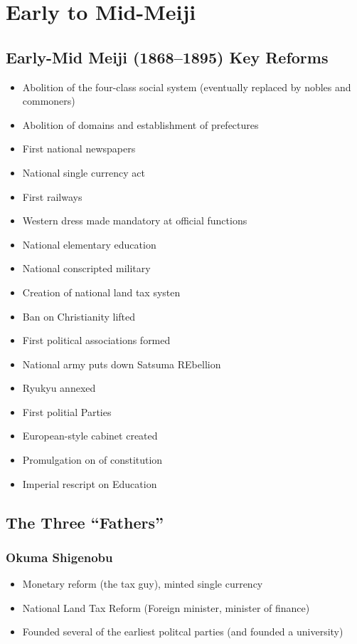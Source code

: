 \documentclass[class=article, crop=false]{standalone}
\begin{document}
  \section{Early to Mid-Meiji}
  \subsection{Early-Mid Meiji (1868--1895) Key Reforms}
  \begin{itemize}
    \item Abolition of the four-class social system (eventually replaced by nobles and commoners)
    \item Abolition of domains and establishment of prefectures
    \item First national newspapers
    \item National single currency act
    \item First railways
    \item Western dress made mandatory at official functions
    \item National elementary education
    \item National conscripted military
    \item Creation of national land tax systen
    \item Ban on Christianity lifted
    \item First political associations formed
    \item National army puts down Satsuma REbellion
    \item Ryukyu annexed
    \item First politial Parties
    \item European-style cabinet created
    \item Promulgation on of constitution
    \item Imperial rescript on Education
  \end{itemize}
  \subsection{The Three ``Fathers''}
  \subsubsection{Okuma Shigenobu}
  \begin{itemize}
    \item Monetary reform (the tax guy), minted single currency
    \item National Land Tax Reform (Foreign minister, minister of finance)
    \item Founded several of the earliest politcal parties (and founded a university)
  \end{itemize}
\end{document}

